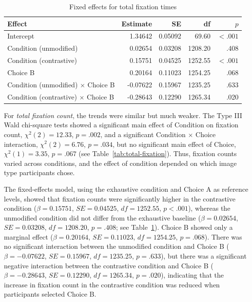 \documentclass[a4paper, ruler]{CUP-JNL-LIN}%
\begin{document}
\begin{table}[htbp]
\centering
\caption{Fixed effects for total fixation times}
\label{tab:total-fixation-fixed}
\begin{tabularx}{\textwidth}{@{}Xrrrr@{}}
\toprule
Effect & Estimate & SE & df & $p$ \\
\midrule
Intercept & 1.34642 & 0.05092 & 69.60 & $< .001$ \\
Condition (unmodified) & 0.02654 & 0.03208 & 1208.20 & .408 \\
Condition (contrastive) & 0.15751 & 0.04525 & 1252.55 & $< .001$ \\
Choice B & 0.20164 & 0.11023 & 1254.25 & .068 \\
Condition (unmodified) $\times$ Choice B & -0.07622 & 0.15967 & 1235.25 & .633 \\
Condition (contrastive) $\times$ Choice B & -0.28643 & 0.12290 & 1265.34 & .020 \\
\bottomrule
\end{tabularx}
\end{table}

For \textit{total fixation count}, the trends were similar but much weaker. The Type III Wald chi-square tests showed a significant main effect of Condition on fixation count, $\chi^2(2)=12.33$, $p=.002$, and a significant Condition $\times$ Choice interaction, $\chi^2(2)=6.76$, $p=.034$, but no significant main effect of Choice, $\chi^2(1)=3.35$, $p=.067$ (see Table~\ref{tab:total-fixation}). Thus, fixation counts varied across conditions, and the effect of condition depended on which image type participants chose.

The fixed-effects model, using the exhaustive condition and Choice A as reference levels, showed that fixation counts were significantly higher in the contrastive condition ($\beta=0.15751$, $SE=0.04525$, $df=1252.55$, $p<.001$), whereas the unmodified condition did not differ from the exhaustive baseline ($\beta=0.02654$, $SE=0.03208$, $df=1208.20$, $p=.408$; see Table~\ref{tab:total-fixation-fixed}). Choice B showed only a marginal effect ($\beta=0.20164$, $SE=0.11023$, $df=1254.25$, $p=.068$). There was no significant interaction between the unmodified condition and Choice B ($\beta=-0.07622$, $SE=0.15967$, $df=1235.25$, $p=.633$), but there was a significant negative interaction between the contrastive condition and Choice B ($\beta=-0.28643$, $SE=0.12290$, $df=1265.34$, $p=.020$), indicating that the increase in fixation count in the contrastive condition was reduced when participants selected Choice B.
\end{document}
